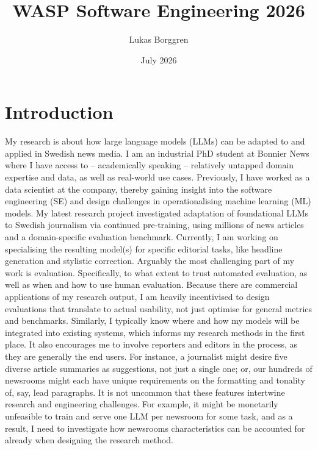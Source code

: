 \documentclass[11pt]{article}
\title{WASP Software Engineering 2026}
\author{Lukas Borggren}
\date{July 2026}
\begin{document}
\maketitle

\section{Introduction}
\label{sec:introduction}
My research is about how large language models (LLMs) can be adapted to and applied in Swedish news media. I am an industrial PhD student at Bonnier News where I have access to – academically speaking – relatively untapped domain expertise and data, as well as real-world use cases. Previously, I have worked as a data scientist at the company, thereby gaining insight into the software engineering (SE) and design challenges in operationalising machine learning (ML) models. My latest research project investigated adaptation of foundational LLMs to Swedish journalism via continued pre-training, using millions of news articles and a domain-specific evaluation benchmark. Currently, I am working on specialising the resulting model(s) for specific editorial tasks, like headline generation and stylistic correction. Arguably the most challenging part of my work is evaluation. Specifically, to what extent to trust automated evaluation, as well as when and how to use human evaluation. Because there are commercial applications of my research output, I am heavily incentivised to design evaluations that translate to actual usability, not just optimise for general metrics and benchmarks. Similarly, I typically know where and how my models will be integrated into existing systems, which informs my research methods in the first place. It also encourages me to involve reporters and editors in the process, as they are generally the end users. For instance, a journalist might desire five diverse article summaries as suggestions, not just a single one; or, our hundreds of newsrooms might each have unique requirements on the formatting and tonality of, say, lead paragraphs. It is not uncommon that these features intertwine research and engineering challenges. For example, it might be monetarily unfeasible to train and serve one LLM per newsroom for some task, and as a result, I need to investigate how newsrooms characteristics can be accounted for already when designing the research method.
\end{document}
